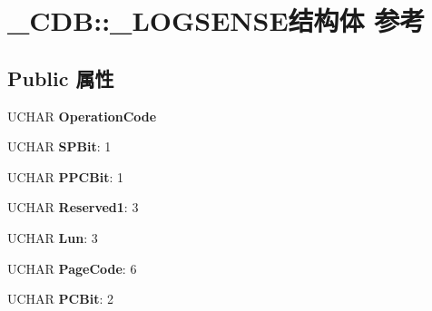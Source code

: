 \hypertarget{struct___c_d_b_1_1___l_o_g_s_e_n_s_e}{}\section{\+\_\+\+C\+DB\+:\+:\+\_\+\+L\+O\+G\+S\+E\+N\+S\+E结构体 参考}
\label{struct___c_d_b_1_1___l_o_g_s_e_n_s_e}
\subsection*{Public 属性}
\begin{DoxyCompactItemize}
\item 
\mbox{\label{struct___c_d_b_1_1___l_o_g_s_e_n_s_e_a6ba9a6d8419b90cdda5826dd3d910516}} 
U\+C\+H\+AR {\bfseries Operation\+Code}
\item 
\mbox{\label{struct___c_d_b_1_1___l_o_g_s_e_n_s_e_adf969526c247fe38e157c6900c5d73c9}} 
U\+C\+H\+AR {\bfseries S\+P\+Bit}\+: 1
\item 
\mbox{\label{struct___c_d_b_1_1___l_o_g_s_e_n_s_e_ae28f7db6814d6efba1869b664033c6ee}} 
U\+C\+H\+AR {\bfseries P\+P\+C\+Bit}\+: 1
\item 
\mbox{\label{struct___c_d_b_1_1___l_o_g_s_e_n_s_e_ac4d2c7ec848bc20811cd6e054d52a7fa}} 
U\+C\+H\+AR {\bfseries Reserved1}\+: 3
\item 
\mbox{\label{struct___c_d_b_1_1___l_o_g_s_e_n_s_e_acea57fa6f72b4f85be71528463e4208f}} 
U\+C\+H\+AR {\bfseries Lun}\+: 3
\item 
\mbox{\label{struct___c_d_b_1_1___l_o_g_s_e_n_s_e_a24dd847746101444f9d99fc15af597b3}} 
U\+C\+H\+AR {\bfseries Page\+Code}\+: 6
\item 
\mbox{\label{struct___c_d_b_1_1___l_o_g_s_e_n_s_e_aad01d6a6a2a425bfbc2115ad261126ea}} 
U\+C\+H\+AR {\bfseries P\+C\+Bit}\+: 2
\item 
\mbox{\label{struct___c_d_b_1_1___l_o_g_s_e_n_s_e_a73b36a532e26b4b93be35d8cf7ecf7f4}} 

\end{DoxyCompactItemize}
